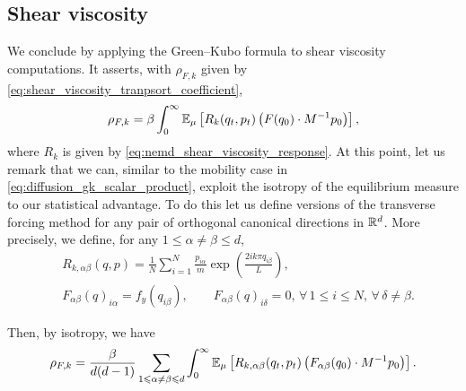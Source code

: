 \subsection{Shear viscosity}
We conclude by applying the Green--Kubo formula to shear viscosity computations. It asserts, with $\rho_{F,k}$ given by \eqref{eq:shear_viscosity_tranpsort_coefficient},
\begin{equation}
    \label{eq:green_kubo_viscosity}
    \rho_{F,k}=\beta\int_0^\infty \mathbb{E}_\mu\left[R_k(q_t,p_t)\left(F(q_0)\cdot M^{-1}p_0\right)\right],
\end{equation}
where $R_k$ is given by \eqref{eq:nemd_shear_viscosity_response}.
At this point, let us remark that we can, similar to the mobility case in \eqref{eq:diffusion_gk_scalar_product}, exploit the isotropy of the equilibrium measure to our statistical advantage.
To do this let us define versions of the transverse forcing method for any pair of orthogonal canonical directions in $\mathbb{R}^d$. More precisely,
we define, for any $1\leq \alpha \neq \beta \leq d$,
\begin{align*}
    &R_{k,\alpha\beta}(q,p)=\frac{1}N\sum_{i=1}^N\frac{p_{i\alpha}}{m}\exp\left(\frac{2ik\pi q_{i\beta}}{L}\right),\\
    &F_{\alpha\beta}(q)_{i\alpha}=f_y(q_{i\beta}),\qquad F_{\alpha\beta}(q)_{i\delta}=0,\,\forall\, 1\leq i\leq N,\, \forall\, \delta \neq \beta.
\end{align*}

Then, by isotropy, we have
\begin{equation}
    \label{eq:green_kubo_viscosity_isotropic}
    \rho_{F,k}=\frac{\beta}{d(d-1)}\sum_{1\leqslant \alpha\neq\beta \leqslant d}\int_0^\infty\mathbb{E}_\mu\left[R_{k,\alpha\beta}(q_t,p_t)\left(F_{\alpha\beta}(q_0)\cdot M^{-1}p_0\right)\right].
\end{equation}

